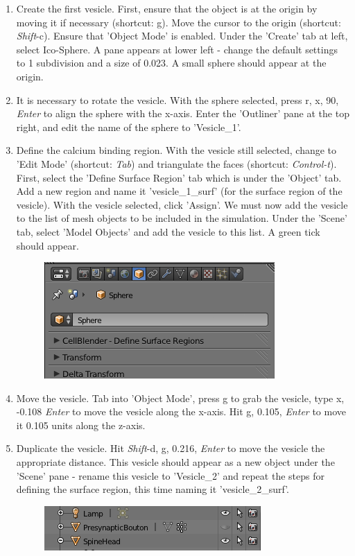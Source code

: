 \documentclass[twoside,a4paper]{refart}
\begin{document}
\begin{enumerate}
\item   Create the first vesicle. First, ensure that the object is at the origin by moving it if necessary (shortcut: g). Move the cursor to the origin (shortcut: \textit{Shift}-c). Ensure that 'Object Mode' is enabled. Under the 'Create' tab at left, select Ico-Sphere. A pane appears at lower left - change the default settings to 1 subdivision and a size of 0.023. A small sphere should appear at the origin.

\item   It is necessary to rotate the vesicle. With the sphere selected, press r, x, 90, \textit{Enter} to align the sphere with the x-axis. Enter the 'Outliner' pane at the top right, and edit the name of the sphere to 'Vesicle\_1'.

\item   Define the calcium binding region. With the vesicle still selected, change to 'Edit Mode' (shortcut: \textit{Tab}) and triangulate the faces (shortcut: \textit{Control-t}). First, select the 'Define Surface Region' tab which is under the 'Object' tab. Add a new region and name it 'vesicle\_1\_surf' (for the surface region of the vesicle). With the vesicle selected, click 'Assign'. We must now add the vesicle to the list of mesh objects to be included in the simulation. Under the 'Scene' tab, select 'Model Objects' and add the vesicle to this list. A green tick should appear.
        \begin{figure}[H]
        \includegraphics[scale=0.5]{vesicle1.png}
        \end{figure}

\item   Move the vesicle. Tab into 'Object Mode', press g to grab the vesicle, type x, -0.108 \textit{Enter} to move the vesicle along the x-axis. Hit g, 0.105, \textit{Enter} to move it 0.105 units along the z-axis. 

\item   Duplicate the vesicle. Hit \textit{Shift}-d, g, 0.216, \textit{Enter} to move the vesicle the appropriate distance. This vesicle should appear as a new object under the 'Scene' pane - rename this vesicle to 'Vesicle\_2' and repeat the steps for defining the surface region, this time naming it 'vesicle\_2\_surf'.
        \begin{figure}[H]
        \includegraphics[scale=0.5]{vesicle3.png}
        \end{figure}


\end{enumerate}
\end{document}

